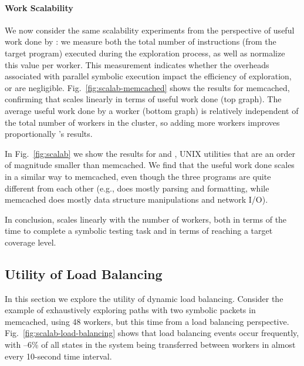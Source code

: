 \paragraph{Work Scalability} We now consider the same scalability experiments from the perspective of useful work done by \cnine: we measure both the total number of instructions (from the target program) executed during the exploration process, as well as normalize this value per worker. This measurement indicates whether the overheads associated with parallel symbolic execution impact the efficiency of exploration, or are negligible. Fig.~\ref{fig:scalab-memcached} shows the results for memcached, confirming that \cnine scales linearly in terms of useful work done (top graph).  The average useful work done by a worker (bottom graph) is relatively independent of the total number of workers in the cluster, so adding more workers improves proportionally \cnine's results.

In Fig.~\ref{fig:scalab} we show the results for  and , UNIX utilities that are an order of magnitude smaller than memcached. We find that the useful work done scales in a similar way to memcached, even though the three programs are quite different from each other (e.g.,  does mostly parsing and formatting, while memcached does mostly data structure manipulations and network I/O).


In conclusion, \cnine scales linearly with the number of workers, both in terms of the time to complete a symbolic testing task and in terms of reaching a target coverage level.  %


\iffalse
\subsection{Utility of Load Balancing}
\label{sec:profiling}
 
In this section we explore the utility of dynamic load balancing.  Consider the example of exhaustively exploring paths with two symbolic packets in memcached, using 48 workers, but this time from a load balancing perspective. Fig.~\ref{fig:scalab-load-balancing} shows that load balancing events occur frequently, with --6\% of all states in the system being transferred between workers in almost every 10-second time interval.


